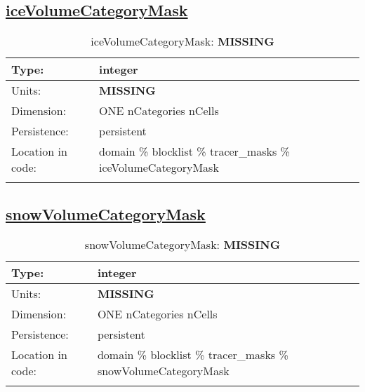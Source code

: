 \subsection[iceVolumeCategoryMask]{\hyperref[sec:var_tab_tracer_masks]{iceVolumeCategoryMask}}
\label{subsec:var_sec_tracer_masks_iceVolumeCategoryMask}
\begin{center}
\begin{longtable}{| p{2.0in} | p{4.0in} |}
        \hline 
        Type: & integer \\
        \hline 
        Units: & {\bf \color{red} MISSING} \\
        \hline 
        Dimension: & ONE nCategories nCells \\
        \hline 
        Persistence: & persistent \\
        \hline 
         Location in code: & domain \% blocklist \% tracer\_masks \% iceVolumeCategoryMask \\
         \hline 
    \caption{iceVolumeCategoryMask: {\bf \color{red} MISSING}}
\end{longtable}
\end{center}
\subsection[snowVolumeCategoryMask]{\hyperref[sec:var_tab_tracer_masks]{snowVolumeCategoryMask}}
\label{subsec:var_sec_tracer_masks_snowVolumeCategoryMask}
\begin{center}
\begin{longtable}{| p{2.0in} | p{4.0in} |}
        \hline 
        Type: & integer \\
        \hline 
        Units: & {\bf \color{red} MISSING} \\
        \hline 
        Dimension: & ONE nCategories nCells \\
        \hline 
        Persistence: & persistent \\
        \hline 
         Location in code: & domain \% blocklist \% tracer\_masks \% snowVolumeCategoryMask \\
         \hline 
    \caption{snowVolumeCategoryMask: {\bf \color{red} MISSING}}
\end{longtable}
\end{center}
